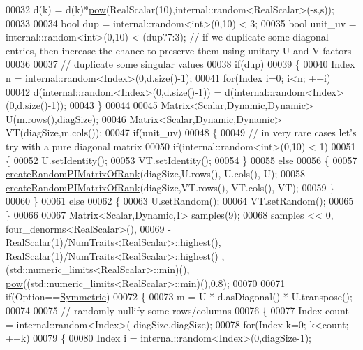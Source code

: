 \begin{DoxyCode}
00032     d(k) = d(k)*\hyperlink{group___core___module_ab6dc101d82e8228a19a8840e3a29c1c9}{pow}(RealScalar(10),internal::random<RealScalar>(-s,s));
00033 
00034   \textcolor{keywordtype}{bool} dup     = internal::random<int>(0,10) < 3;
00035   \textcolor{keywordtype}{bool} unit\_uv = internal::random<int>(0,10) < (dup?7:3); \textcolor{comment}{// if we duplicate some diagonal entries, then
       increase the chance to preserve them using unitary U and V factors}
00036   
00037   \textcolor{comment}{// duplicate some singular values}
00038   \textcolor{keywordflow}{if}(dup)
00039   \{
00040     Index n = internal::random<Index>(0,d.size()-1);
00041     \textcolor{keywordflow}{for}(Index i=0; i<n; ++i)
00042       d(internal::random<Index>(0,d.size()-1)) = d(internal::random<Index>(0,d.size()-1));
00043   \}
00044   
00045   Matrix<Scalar,Dynamic,Dynamic> U(m.rows(),diagSize);
00046   Matrix<Scalar,Dynamic,Dynamic> VT(diagSize,m.cols());
00047   \textcolor{keywordflow}{if}(unit\_uv)
00048   \{
00049     \textcolor{comment}{// in very rare cases let's try with a pure diagonal matrix}
00050     \textcolor{keywordflow}{if}(internal::random<int>(0,10) < 1)
00051     \{
00052       U.setIdentity();
00053       VT.setIdentity();
00054     \}
00055     \textcolor{keywordflow}{else}
00056     \{
00057       \hyperlink{namespace_eigen_a0d9a7ddcee5c7c8defaba3628455efb2}{createRandomPIMatrixOfRank}(diagSize,U.rows(), U.cols(), U);
00058       \hyperlink{namespace_eigen_a0d9a7ddcee5c7c8defaba3628455efb2}{createRandomPIMatrixOfRank}(diagSize,VT.rows(), VT.cols(), VT);
00059     \}
00060   \}
00061   \textcolor{keywordflow}{else}
00062   \{
00063     U.setRandom();
00064     VT.setRandom();
00065   \}
00066   
00067   Matrix<Scalar,Dynamic,1> samples(9);
00068   samples << 0, four\_denorms<RealScalar>(),
00069             -RealScalar(1)/NumTraits<RealScalar>::highest(), RealScalar(1)/NumTraits<RealScalar>::highest()
      , (std::numeric\_limits<RealScalar>::min)(), \hyperlink{group___core___module_ab6dc101d82e8228a19a8840e3a29c1c9}{pow}((std::numeric\_limits<RealScalar>::min)(),0.8);
00070   
00071   \textcolor{keywordflow}{if}(Option==\hyperlink{group__enums_gga39e3366ff5554d731e7dc8bb642f83cda7d30fb969ef6b763c098f0015108cef4}{Symmetric})
00072   \{
00073     m = U * d.asDiagonal() * U.transpose();
00074     
00075     \textcolor{comment}{// randomly nullify some rows/columns}
00076     \{
00077       Index count = internal::random<Index>(-diagSize,diagSize);
00078       \textcolor{keywordflow}{for}(Index k=0; k<count; ++k)
00079       \{
00080         Index i = internal::random<Index>(0,diagSize-1);

\end{DoxyCode}
